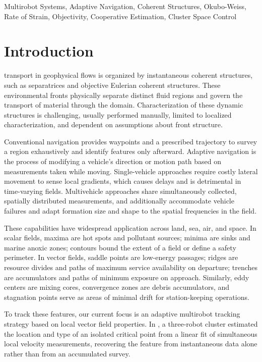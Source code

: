 \documentclass[lettersize,journal]{IEEEtran}
\begin{document}
\begin{IEEEkeywords}
Multirobot Systems, Adaptive Navigation, Coherent Structures,
Okubo-Weiss, Rate of Strain, Objectivity, Cooperative
Estimation, Cluster Space Control
\end{IEEEkeywords}

\section{Introduction}

 transport in geophysical flows is organized by instantaneous coherent structures, such as separatrices and objective Eulerian coherent structures. These environmental fronts physically separate distinct fluid regions and govern the transport of material through the domain. Characterization of these dynamic structures is challenging, usually performed manually, limited to localized characterization, and dependent on assumptions about front structure. 

Conventional navigation provides waypoints and a prescribed trajectory to survey a region exhaustively and identify features only afterward. Adaptive navigation is the process of modifying a vehicle's direction or motion path based on measurements taken while moving. Single-vehicle approaches require costly lateral movement to sense local gradients, which causes delays and is detrimental in time-varying fields. Multivehicle approaches share simultaneously collected, spatially distributed measurements, and additionally accommodate vehicle failures and adapt formation size and shape to the spatial frequencies in the field.

These capabilities have widespread application across land, sea, air, and space. In scalar fields, maxima are hot spots and pollutant sources; minima are sinks and marine anoxic zones; contours bound the extent of a field or define a safety perimeter. In vector fields, saddle points are low-energy passages; ridges are resource divides and paths of maximum service availability on departure; trenches are accumulators and paths of minimum exposure on approach. Similarly, eddy centers are mixing cores, convergence zones are debris accumulators, and stagnation points serve as areas of minimal drift for station-keeping operations.

To track these features, our current focus is an adaptive multirobot tracking strategy based on local vector field properties. In \cite{9}, a three-robot cluster estimated the location and type of an isolated critical point from a linear fit of simultaneous local velocity measurements, recovering the feature from instantaneous data alone rather than from an accumulated survey.
\end{document}
